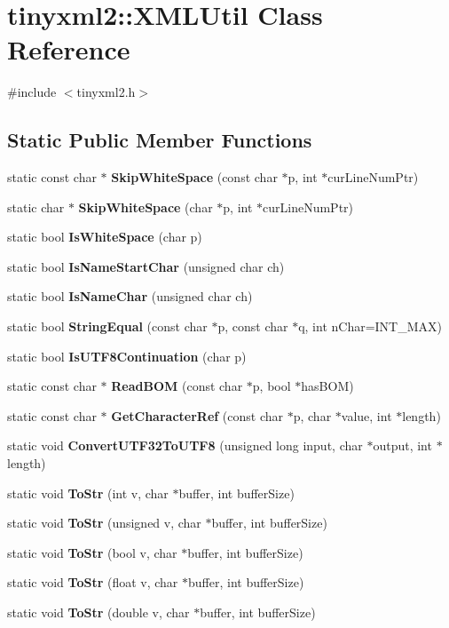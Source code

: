 \section{tinyxml2\+::X\+M\+L\+Util Class Reference}
\label{classtinyxml2_1_1_x_m_l_util}


{\ttfamily \#include $<$tinyxml2.\+h$>$}

\subsection*{Static Public Member Functions}
\begin{DoxyCompactItemize}
\item 
static const char $\ast$ \textbf{ Skip\+White\+Space} (const char $\ast$p, int $\ast$cur\+Line\+Num\+Ptr)
\item 
static char $\ast$ \textbf{ Skip\+White\+Space} (char $\ast$p, int $\ast$cur\+Line\+Num\+Ptr)
\item 
static bool \textbf{ Is\+White\+Space} (char p)
\item 
static bool \textbf{ Is\+Name\+Start\+Char} (unsigned char ch)
\item 
static bool \textbf{ Is\+Name\+Char} (unsigned char ch)
\item 
static bool \textbf{ String\+Equal} (const char $\ast$p, const char $\ast$q, int n\+Char=I\+N\+T\+\_\+\+M\+AX)
\item 
static bool \textbf{ Is\+U\+T\+F8\+Continuation} (char p)
\item 
static const char $\ast$ \textbf{ Read\+B\+OM} (const char $\ast$p, bool $\ast$has\+B\+OM)
\item 
static const char $\ast$ \textbf{ Get\+Character\+Ref} (const char $\ast$p, char $\ast$value, int $\ast$length)
\item 
static void \textbf{ Convert\+U\+T\+F32\+To\+U\+T\+F8} (unsigned long input, char $\ast$output, int $\ast$length)
\item 
static void \textbf{ To\+Str} (int v, char $\ast$buffer, int buffer\+Size)
\item 
static void \textbf{ To\+Str} (unsigned v, char $\ast$buffer, int buffer\+Size)
\item 
static void \textbf{ To\+Str} (bool v, char $\ast$buffer, int buffer\+Size)
\item 
static void \textbf{ To\+Str} (float v, char $\ast$buffer, int buffer\+Size)
\item 
static void \textbf{ To\+Str} (double v, char $\ast$buffer, int buffer\+Size)

\end{DoxyCompactItemize}
